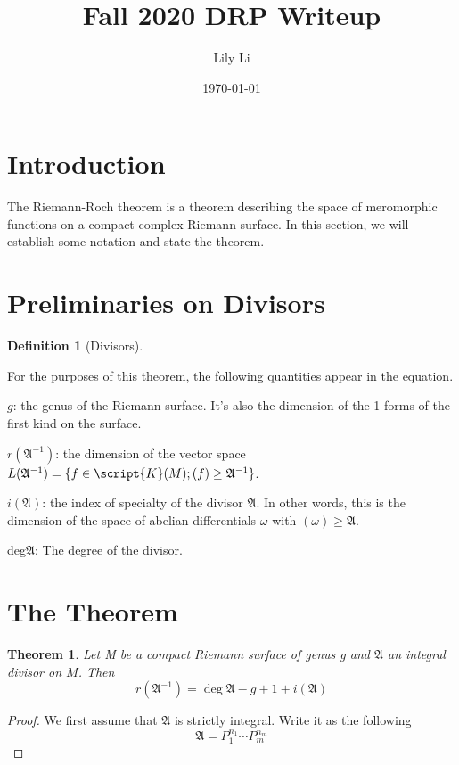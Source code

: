 \documentclass{amsart}
\title{Fall 2020 DRP Writeup}
\author{Lily Li}
\date{\today}
\newtheorem{thm}{Theorem}[section]
\theoremstyle{definition}
\theoremstyle{definition}
\theoremstyle{remark}
\theoremstyle{definition}
\newtheorem{defn}{Definition}[section]
\newcommand{\A}{\mathfrak{A}}
\begin{document}
\maketitle

\tableofcontents

\section{Introduction}
\label{sec:intro}

The Riemann-Roch theorem is a theorem describing the space of meromorphic functions on a compact complex Riemann surface. In this section, we will establish some notation and state the theorem. 


\section{Preliminaries on Divisors}
\begin{defn}[Divisors]

\end{defn}

For the purposes of this theorem, the following quantities appear in the equation. 

$g$: the genus of the Riemann surface. It's also the dimension of the 1-forms of the first kind on the surface.

$r(\mathfrak{A}^{-1})$: the dimension of the vector space $L(\mathfrak{A}^{-1})=\{f\in\script{K}(M); (f)\geq\mathfrak{A}^{-1}\}$. 

$i(\A)$: the index of specialty of the divisor $\A$. In other words, this is the dimension of the space of abelian differentials $\omega$ with $(\omega)\geq \A$.

deg$\A$: The degree of the divisor.

\section{The Theorem}
\begin{thm}
Let M be a compact Riemann surface of genus g and $\A$ an integral divisor on $M$. Then 
$$r(\A^{-1})=\deg \A -g+1+i(\A)$$
\end{thm}

\begin{proof}
We first assume that $\A$ is strictly integral. Write it as the following 
$$\A = P_1^{n_1}\cdots P_m^{n_m}$$
\end{proof}



\end{document}
